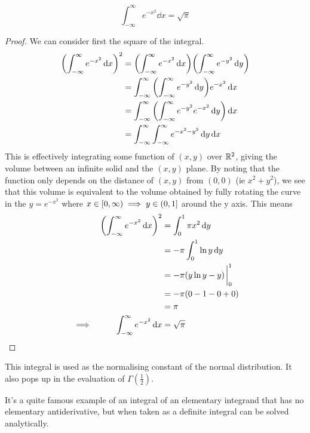 \begin{theorem} \label{thm_gauss_integral}
\begin{equation*}
\int_{-\infty}^\infty e^{-x^2} \dd{x} = \sqrt \pi
\end{equation*}
\end{theorem}
\begin{proof}
We can consider first the square of the integral.
\begin{align*}
\pqty{\int_{-\infty}^\infty e^{-x^2} \dd{x}}^2
    &= \pqty{\int_{-\infty}^\infty e^{-x^2} \dd{x}}
       \pqty{\int_{-\infty}^\infty e^{-y^2} \dd{y}} \\
    &= \int_{-\infty}^\infty
                   \pqty{\int_{-\infty}^\infty e^{-y^2} \dd{y}}
               e^{-x^2} \dd{x} \\
    &= \int_{-\infty}^\infty
           \pqty{\int_{-\infty}^\infty e^{-y^2} e^{-x^2} \dd{y}} \dd{x} \\
    &= \int_{-\infty}^\infty
           \int_{-\infty}^\infty e^{-x^2-y^2} \dd{y} \dd{x}
\end{align*}
This is effectively integrating some function of \((x, y)\) over
\(\mathbb R^2\), giving the volume between an infinite solid and the \((x, y)\)
plane. By noting that the function only depends on the distance of
\((x, y)\) from \((0, 0)\) (ie \(x^2 + y^2\)), we see that this volume is
equivalent to the volume obtained by fully rotating the curve in the
\(y = e^{-x^2}\) where
\(x \in [0, \infty) \implies y \in (0, 1]\) around the y axis.
This means
\begin{alignat*}{2}
&& \pqty{\int_{-\infty}^\infty e^{-x^2} \dd{x}}^2
    &= \int_0^1 \pi x^2 \dd{y} \\
&&  &= -\pi \int_0^1 \ln y \dd{y} \\
&&  &= -\pi (y\ln y - y)\eval_0^1 \\
&&  &= -\pi \pqty{0 - 1 - 0 + 0} \\
&&  &= \pi \\
&\implies& \int_{-\infty}^\infty e^{-x^2} \dd{x}
    &= \sqrt \pi \tag*{\qedhere}
\end{alignat*}
\end{proof}
This integral is used as the normalising constant of the normal
distribution. It also pops up in the evaluation of \(\Gamma(\frac 12)\).

It's a quite famous example of an integral of an elementary integrand that
has no elementary antiderivative, but when taken as a definite integral can
be solved analytically.

